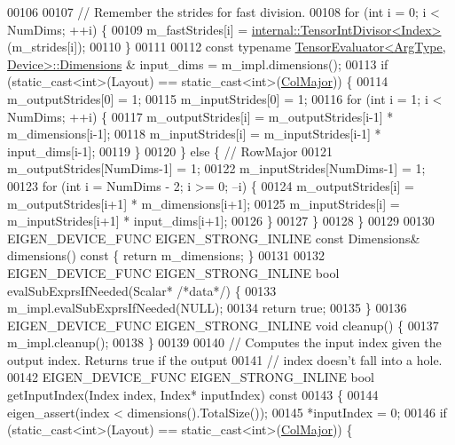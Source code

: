 \begin{DoxyCode}
00106 
00107     \textcolor{comment}{// Remember the strides for fast division.}
00108     \textcolor{keywordflow}{for} (\textcolor{keywordtype}{int} i = 0; i < NumDims; ++i) \{
00109       m\_fastStrides[i] = \hyperlink{struct_eigen_1_1internal_1_1_tensor_int_divisor}{internal::TensorIntDivisor<Index>}(m\_strides[i]);
00110     \}
00111 
00112     \textcolor{keyword}{const} \textcolor{keyword}{typename} \hyperlink{struct_eigen_1_1_tensor_evaluator}{TensorEvaluator<ArgType, Device>::Dimensions}
      & input\_dims = m\_impl.dimensions();
00113     \textcolor{keywordflow}{if} (static\_cast<int>(Layout) == static\_cast<int>(\hyperlink{group__enums_ggaacded1a18ae58b0f554751f6cdf9eb13a0cbd4bdd0abcfc0224c5fcb5e4f6669a}{ColMajor})) \{
00114       m\_outputStrides[0] = 1;
00115       m\_inputStrides[0] = 1;
00116       \textcolor{keywordflow}{for} (\textcolor{keywordtype}{int} i = 1; i < NumDims; ++i) \{
00117         m\_outputStrides[i] = m\_outputStrides[i-1] * m\_dimensions[i-1];
00118         m\_inputStrides[i] = m\_inputStrides[i-1] * input\_dims[i-1];
00119       \}
00120     \} \textcolor{keywordflow}{else} \{  \textcolor{comment}{// RowMajor}
00121       m\_outputStrides[NumDims-1] = 1;
00122       m\_inputStrides[NumDims-1] = 1;
00123       \textcolor{keywordflow}{for} (\textcolor{keywordtype}{int} i = NumDims - 2; i >= 0; --i) \{
00124         m\_outputStrides[i] = m\_outputStrides[i+1] * m\_dimensions[i+1];
00125         m\_inputStrides[i] = m\_inputStrides[i+1] * input\_dims[i+1];
00126       \}
00127     \}
00128   \}
00129 
00130   EIGEN\_DEVICE\_FUNC EIGEN\_STRONG\_INLINE \textcolor{keyword}{const} Dimensions& dimensions()\textcolor{keyword}{ const }\{ \textcolor{keywordflow}{return} m\_dimensions; \}
00131 
00132   EIGEN\_DEVICE\_FUNC EIGEN\_STRONG\_INLINE \textcolor{keywordtype}{bool} evalSubExprsIfNeeded(Scalar* \textcolor{comment}{/*data*/}) \{
00133     m\_impl.evalSubExprsIfNeeded(NULL);
00134     \textcolor{keywordflow}{return} \textcolor{keyword}{true};
00135   \}
00136   EIGEN\_DEVICE\_FUNC EIGEN\_STRONG\_INLINE \textcolor{keywordtype}{void} cleanup() \{
00137     m\_impl.cleanup();
00138   \}
00139 
00140   \textcolor{comment}{// Computes the input index given the output index. Returns true if the output}
00141   \textcolor{comment}{// index doesn't fall into a hole.}
00142   EIGEN\_DEVICE\_FUNC EIGEN\_STRONG\_INLINE \textcolor{keywordtype}{bool} getInputIndex(Index index, Index* inputIndex)\textcolor{keyword}{ const}
00143 \textcolor{keyword}{  }\{
00144     eigen\_assert(index < dimensions().TotalSize());
00145     *inputIndex = 0;
00146     \textcolor{keywordflow}{if} (static\_cast<int>(Layout) == static\_cast<int>(\hyperlink{group__enums_ggaacded1a18ae58b0f554751f6cdf9eb13a0cbd4bdd0abcfc0224c5fcb5e4f6669a}{ColMajor})) \{

\end{DoxyCode}
